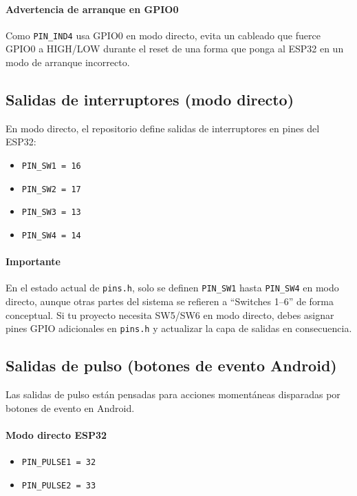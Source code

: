 \paragraph{Advertencia de arranque en GPIO0}
Como \texttt{PIN\_IND4} usa GPIO0 en modo directo, evita un cableado que fuerce GPIO0 a HIGH/LOW durante el reset de una forma que
ponga al ESP32 en un modo de arranque incorrecto.

\subsection{Salidas de interruptores (modo directo)}
En modo directo, el repositorio define salidas de interruptores en pines del ESP32:

\begin{itemize}
    \item \texttt{PIN\_SW1 = 16}
    \item \texttt{PIN\_SW2 = 17}
    \item \texttt{PIN\_SW3 = 13}
    \item \texttt{PIN\_SW4 = 14}
\end{itemize}

\paragraph{Importante}
En el estado actual de \texttt{pins.h}, solo se definen \texttt{PIN\_SW1} hasta \texttt{PIN\_SW4} en modo directo,
aunque otras partes del sistema se refieren a ``Switches 1--6'' de forma conceptual. Si tu proyecto necesita SW5/SW6 en modo directo,
debes asignar pines GPIO adicionales en \texttt{pins.h} y actualizar la capa de salidas en consecuencia.

\subsection{Salidas de pulso (botones de evento Android)}
Las salidas de pulso están pensadas para acciones momentáneas disparadas por botones de evento en Android.

\paragraph{Modo directo ESP32}
\begin{itemize}
    \item \texttt{PIN\_PULSE1 = 32}
    \item \texttt{PIN\_PULSE2 = 33}
\end{itemize}

